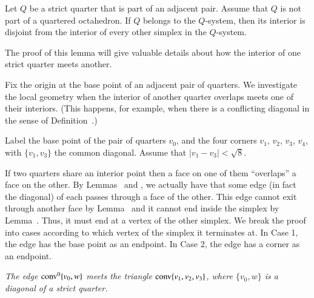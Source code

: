 \begin{tarskidata}
\begin{tarski}

\begin{lemma}
Let $Q$ be a strict quarter that is part of an adjacent pair.
Assume that $Q$ is not part of a quartered octahedron.  If $Q$
belongs to the $Q$-system, then its interior is disjoint from the
interior of every other simplex in the $Q$-system.
\end{lemma}

The proof of this lemma will give valuable details about how the
interior of one strict quarter meets another.

\begin{proved}
Fix the origin at the base point of an adjacent pair of quarters.
We investigate the local geometry when the interior of another
quarter overlaps meets one of their interiors.  (This happens, for
example, when there is a conflicting diagonal in the sense of
Definition~.)

Label the base point of the pair of quarters $v_0$, and the four
corners  $v_1$, $v_2$, $v_3$, $v_4$, with $\{v_1,v_3\}$ the common
diagonal. Assume that $|v_1-v_3|<\sqrt8$.

If two quarters share an interior point then a face on one of them
``overlaps'' a face on the other.  By
Lemmas~ and , we
actually have that some edge (in fact the diagonal) of each passes
through a face of the other.  This edge cannot exit through
another face by Lemma~ and it cannot end
inside the simplex by Lemma~. Thus, it must
end at a vertex of the other simplex.  We break the proof into
cases according to which vertex of the simplex it terminates at.
In Case 1, the edge has the base point as an endpoint.  In Case 2,
the edge has a corner as an endpoint.

 {\it The edge ${\operatorname{conv}}^0\{v_0,w\}$ meets 
the
triangle ${\operatorname{conv}}\{v_1,v_2,v_3\}$, where $\{v_0,w\}$ is a diagonal of a
strict quarter.}


\end{proved}
\end{tarski}
\end{tarskidata}

